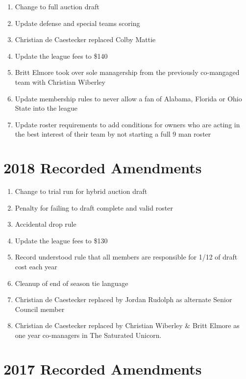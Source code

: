 \documentclass[
]{book}
\providecommand{\tightlist}{%
  \setlength{\itemsep}{0pt}\setlength{\parskip}{0pt}}
\begin{document}
\begin{enumerate}
\def\labelenumi{\arabic{enumi}.}
\tightlist
\item
  Change to full auction draft
\item
  Update defense and special teams scoring
\item
  Christian de Caestecker replaced Colby Mattie
\item
  Update the league fees to \$140
\item
  Britt Elmore took over sole managership from the previously co-mangaged team with Christian Wiberley
\item
  Update membership rules to never allow a fan of Alabama, Florida or Ohio State into the league
\item
  Update roster requirements to add conditions for owners who are acting in the best interest of their team by not starting a full 9 man roster
\end{enumerate}

\hypertarget{recorded-amendments-2}{%
\section{2018 Recorded Amendments}\label{recorded-amendments-2}}

\begin{enumerate}
\def\labelenumi{\arabic{enumi}.}
\tightlist
\item
  Change to trial run for hybrid auction draft
\item
  Penalty for failing to draft complete and valid roster
\item
  Accidental drop rule
\item
  Update the league fees to \$130
\item
  Record understood rule that all members are responsible for 1/12 of draft cost each year
\item
  Cleanup of end of season tie language
\item
  Christian de Caestecker replaced by Jordan Rudolph as alternate Senior Council member
\item
  Christian de Caestecker replaced by Christian Wiberley \& Britt Elmore as one year co-managers in The Saturated Unicorn.
\end{enumerate}

\hypertarget{recorded-amendments-3}{%
\section{2017 Recorded Amendments}\label{recorded-amendments-3}}
\end{document}

